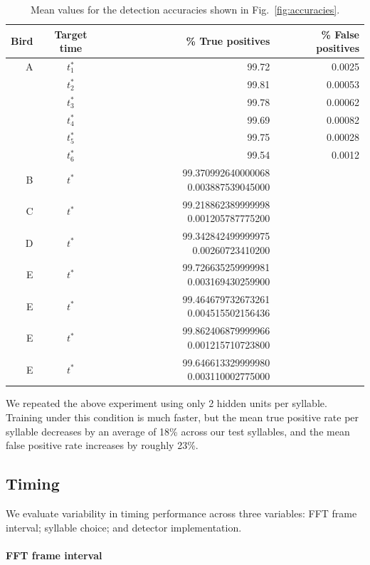 \documentclass[10pt,letterpaper]{article}
\newcommand\fig[1]{Fig.~\ref{#1}}
\renewcommand{\subsubsection}[1]{\paragraph{#1}}
\begin{document}
\begin{table}
  \begin{tabular}{rc|rr}
    Bird & Target time & \% True positives & \% False positives \\ \hline
    A&$ t^*_1$ & 99.72 &  0.0025 \\ %
    &$ t^*_2$ & 99.81 &  0.00053 \\
    &$ t^*_3$ & 99.78 &  0.00062 \\
    &$ t^*_4$ & 99.69 &  0.00082 \\
    &$ t^*_5$ & 99.75 &  0.00028 \\
    &$ t^*_6$ & 99.54 &  0.0012 \\
    B&$ t^*$ & 99.370992640000068   0.003887539045000 \\ %
    C&$ t^*$ & 99.218862389999998   0.001205787775200 \\ %
    D&$ t^*$ & 99.342842499999975   0.00260723410200  \\ %
    E& $t^*$ & 99.726635259999981   0.003169430259900 \\ %
    E& $t^*$ & 99.464679732673261   0.004515502156436 \\ %
    E& $t^*$ & 99.862406879999966   0.001215710723800 \\ %
    E& $t^*$ & 99.646613329999980   0.003110002775000 %
  \end{tabular}
  \caption{Mean values for the detection accuracies shown in \fig{fig:accuracies}.}
  \label{table:accuracies}
\end{table}
  

We repeated the above experiment using only 2 hidden units per syllable.  Training under this condition is much faster, but the mean true positive rate per syllable decreases by an average of 18\% across our test syllables, and the mean false positive rate increases by roughly 23\%.

\subsection{Timing}

We evaluate variability in timing performance across three variables:
FFT frame interval; syllable choice; and detector implementation.

\subsubsection{FFT frame interval}
\end{document}
